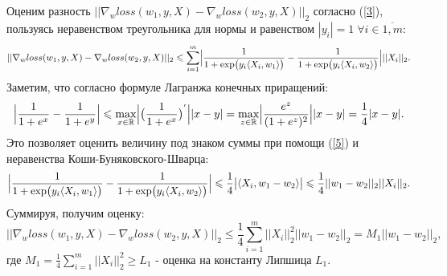 \documentclass[12pt,twoside]{article}
\begin{document}
Оценим разность $||\nabla_w loss(w_1, y, X) - \nabla_w loss(w_2, y, X)||_2$ согласно (\ref{3}), пользуясь неравенством треугольника для нормы и равенством $|y_i| = 1 \; \forall i \in \overline{1, m}$:
\begin{equation}
||\nabla_w loss(w_1, y, X) - \nabla_w loss(w_2, y, X)||_2 \leq
\sum\limits_{i = 1}^m\Bigl|\frac{1}{1 + \exp\bigl(y_i\langle X_i, w_1 \rangle\bigr)} - \frac{1}{1 + \exp\bigl(y_i\langle X_i, w_2 \rangle\bigr)}\Bigr|||X_i||_2.
\end{equation}
Заметим, что согласно формуле Лагранжа конечных приращений:
\begin{equation} \label{5}
\Bigl|\frac{1}{1 + e^x} - \frac{1}{1 + e^y}\Bigr| \leq \max_{x \in \mathbb{R}}\Bigl|\bigl(\frac{1}{1 + e^x}\bigr)^{'}\Bigr||x - y| = \max_{z \in \mathbb{R}}\Bigl|\frac{e^z}{(1 + e^z)^2}\Bigr||x - y| = \frac{1}{4}|x - y|.
\end{equation}
Это позволяет оценить величину под знаком суммы при помощи (\ref{5}) и неравенства Коши-Буняковского-Шварца:
\begin{equation}
\Bigl|\frac{1}{1 + \exp\bigl(y_i\langle X_i, w_1 \rangle\bigr)} - \frac{1}{1 + \exp\bigl(y_i\langle X_i, w_2 \rangle\bigr)}\Bigr| \leq \frac{1}{4}\bigl|\langle X_i, w_1 - w_2 \rangle\bigr| \leq \frac{1}{4}||w_1 - w_2||_2 ||X_i||_2.
\end{equation}
Суммируя, получим оценку:
\begin{equation}
||\nabla_w loss(w_1, y, X) - \nabla_w loss(w_2, y, X)||_2 \leq \frac{1}{4}\sum\limits_{i = 1}^m ||X_i||_2^2 ||w_1 - w_2||_2 = M_1||w_1 - w_2||_2,
\end{equation}
где $M_1 = \frac{1}{4}\sum\limits_{i = 1}^m ||X_i||_2^2 \geq L_1$ - оценка на константу Липшица $L_1$.
 
\end{document}
